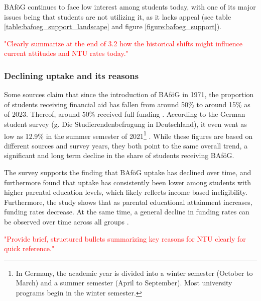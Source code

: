 BAföG continues to face low interest among students today, with one of its major issues being that students are not utilizing it, as it lacks appeal (see table \ref{table:bafoeg_support_landscape} and figure \ref{figure:bafoeg_support}). 


\textcolor{red}{"Clearly summarize at the end of 3.2 how the historical shifts might influence current attitudes and NTU rates today."}


\subsubsection{Declining uptake and its reasons} \label{subsection:declining-uptake}
Some sources claim that since the introduction of BAföG in 1971, the proportion of students receiving financial aid has fallen from around 50\% to around 15\% as of 2023. Thereof, around 50\% received full funding \citep{meier_zur_2024}. According to the German student survey (g. Die Studierendenbefragung in Deutschland), it even went as low as 12.9\% in the summer semester of 2021\footnote{
In Germany, the academic year is divided into a winter semester (October to March) and a summer semester (April to September). Most university programs begin in the winter semester.
} \citep{kroher_studierendenbefragung_2023}. While these figures are based on different sources and survey years, they both point to the same overall trend, a significant and long term decline in the share of students receiving BAföG.

The survey supports the finding that BAföG uptake has declined over time, and furthermore found that uptake has consistently been lower among students with higher parental education levels, which likely reflects income based ineligibility. Furthermore, the study shows that as parental educational attainment increases, funding rates decrease. At the same time, a general decline in funding rates can be observed over time across all groups \citep{kroher_studierendenbefragung_2023}.

\textcolor{red}{"Provide brief, structured bullets summarizing key reasons for NTU clearly for quick reference."}


